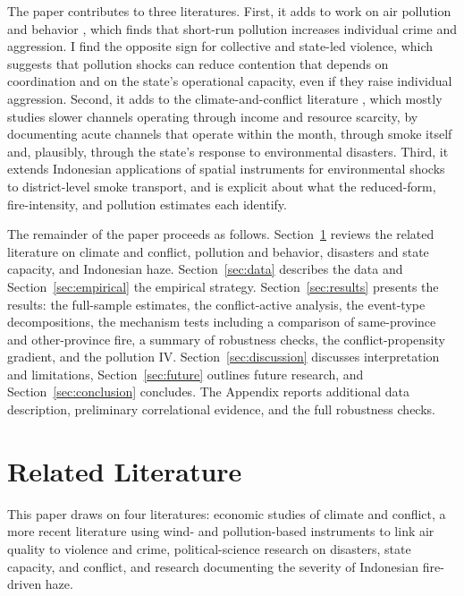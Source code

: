 \documentclass[12pt]{article}
\begin{document}
The paper contributes to three literatures. First, it adds to work on air pollution and behavior \citep{herrnstadt2021, bondyrothsager2020, burkhardt2019}, which finds that short-run pollution increases individual crime and aggression. I find the opposite sign for collective and state-led violence, which suggests that pollution shocks can reduce contention that depends on coordination and on the state's operational capacity, even if they raise individual aggression. Second, it adds to the climate-and-conflict literature \citep{hsiang2013quantifying, burkehsiangmiguel2015, miguelsatyanathsergenti2004}, which mostly studies slower channels operating through income and resource scarcity, by documenting acute channels that operate within the month, through smoke itself and, plausibly, through the state's response to environmental disasters. Third, it extends Indonesian applications of spatial instruments for environmental shocks \citep{lu2023fish} to district-level smoke transport, and is explicit about what the reduced-form, fire-intensity, and pollution estimates each identify.

The remainder of the paper proceeds as follows. Section~\ref{sec:litreview} reviews the related literature on climate and conflict, pollution and behavior, disasters and state capacity, and Indonesian haze. Section~\ref{sec:data} describes the data and Section~\ref{sec:empirical} the empirical strategy. Section~\ref{sec:results} presents the results: the full-sample estimates, the conflict-active analysis, the event-type decompositions, the mechanism tests including a comparison of same-province and other-province fire, a summary of robustness checks, the conflict-propensity gradient, and the pollution IV. Section~\ref{sec:discussion} discusses interpretation and limitations, Section~\ref{sec:future} outlines future research, and Section~\ref{sec:conclusion} concludes. The Appendix reports additional data description, preliminary correlational evidence, and the full robustness checks.

\section{Related Literature}
\label{sec:litreview}

This paper draws on four literatures: economic studies of climate and conflict, a more recent literature using wind- and pollution-based instruments to link air quality to violence and crime, political-science research on disasters, state capacity, and conflict, and research documenting the severity of Indonesian fire-driven haze.
\end{document}
